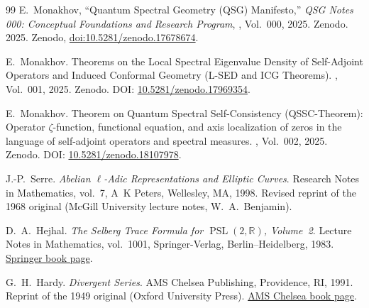 \documentclass{article}
\numberwithin{equation}{section}
\theoremstyle{plain}
\theoremstyle{definition}
\theoremstyle{remark}
\begin{document}
\begin{thebibliography}{99}
E.~Monakhov,
``Quantum Spectral Geometry (QSG) Manifesto,''
\emph{QSG Notes 000: Conceptual Foundations and Research Program},
, Vol.~000, 2025.
\newblock Zenodo.
2025. Zenodo,
\href{https://doi.org/10.5281/zenodo.17678674}{doi:10.5281/zenodo.17678674}.

E.~Monakhov.
\newblock Theorems on the Local Spectral Eigenvalue Density of Self-Adjoint Operators and Induced Conformal Geometry (L-SED and ICG Theorems).
, Vol.~001, 2025.
\newblock Zenodo.
\newblock DOI: \href{https://doi.org/10.5281/zenodo.17969354}{10.5281/zenodo.17969354}.

E.~Monakhov.
\newblock Theorem on Quantum Spectral Self-Consistency (QSSC-Theorem):
Operator $\zeta$-function, functional equation, and axis localization of zeros
in the language of self-adjoint operators and spectral measures.
, Vol.~002, 2025.
\newblock Zenodo.
\newblock DOI: \href{https://doi.org/10.5281/zenodo.18107978}{10.5281/zenodo.18107978}.

J.-P.~Serre.
\newblock \emph{Abelian $\ell$-Adic Representations and Elliptic Curves}.
\newblock Research Notes in Mathematics, vol.~7, A~K Peters, Wellesley, MA, 1998.
\newblock Revised reprint of the 1968 original (McGill University lecture notes, W.~A.~Benjamin).

D.~A.~Hejhal.
\newblock \emph{The Selberg Trace Formula for $\operatorname{PSL}(2,\mathbb{R})$, Volume~2}.
\newblock Lecture Notes in Mathematics, vol.~1001, Springer-Verlag, Berlin--Heidelberg, 1983.
\newblock \href{https://link.springer.com/book/10.1007/BFb0061302}{Springer book page}.

G.~H.~Hardy.
\newblock \emph{Divergent Series}.
\newblock AMS Chelsea Publishing, Providence, RI, 1991.
\newblock Reprint of the 1949 original (Oxford University Press).
\newblock \href{https://bookstore.ams.org/chel-334-h/}{AMS Chelsea book page}.



\end{thebibliography}
\end{document}

